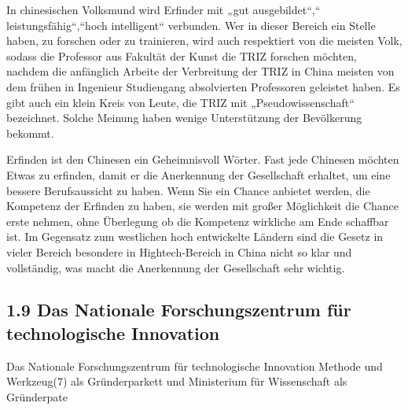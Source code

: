 \documentclass[11pt,a4paper]{article}
\begin{document}
In chinesischen Volksmund wird Erfinder mit „gut ausgebildet“,“
leistungsfähig“,“hoch intelligent“ verbunden. Wer in dieser Bereich ein Stelle
haben, zu forschen oder zu trainieren, wird auch respektiert von die meisten
Volk, sodass die Professor aus Fakultät der Kunst die TRIZ forschen möchten,
nachdem die anfänglich Arbeite der Verbreitung der TRIZ in China  meisten von
dem frühen in Ingenieur Studiengang absolvierten Professoren geleistet
haben. Es gibt auch ein klein Kreis von Leute, die TRIZ mit
„Pseudowissenschaft“  bezeichnet.  Solche Meinung haben wenige Unterstützung
der Bevölkerung bekommt. 

Erfinden ist den Chinesen ein Geheimnisvoll Wörter. Fast jede Chinesen möchten
Etwas zu erfinden, damit er die Anerkennung der Gesellschaft erhaltet, um eine
bessere Berufsaussicht zu haben. Wenn Sie ein Chance anbietet werden, die
Kompetenz der Erfinden zu haben, sie werden mit großer Möglichkeit die Chance
erste nehmen, ohne Überlegung ob die Kompetenz wirkliche am Ende schaffbar
ist. Im Gegensatz zum westlichen hoch entwickelte Ländern sind die Gesetz in
vieler Bereich besondere in Hightech-Bereich in China nicht so klar und
vollständig, was macht die Anerkennung der Gesellschaft sehr wichtig. 

\subsection{1.9 Das Nationale Forschungszentrum für technologische Innovation}

Das Nationale Forschungszentrum für technologische Innovation Methode und
Werkzeug(7) als Gründerparkett und Ministerium für Wissenschaft als
Gründerpate
\end{document}
